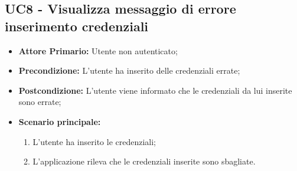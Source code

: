 \subsection{UC8 - Visualizza messaggio di errore inserimento credenziali}
\label{UC8}
\begin{itemize}
\item \textbf{Attore Primario:} Utente non autenticato;
\item \textbf{Precondizione:} L'utente ha inserito delle credenziali errate;
\item \textbf{Postcondizione:} L'utente viene informato che le credenziali da lui inserite sono errate;
\item \textbf{Scenario principale:}
    \begin{enumerate}
    \item L'utente ha inserito le credenziali;
    \item L'applicazione rileva che le credenziali inserite sono sbagliate.
    \end{enumerate}
\end{itemize}